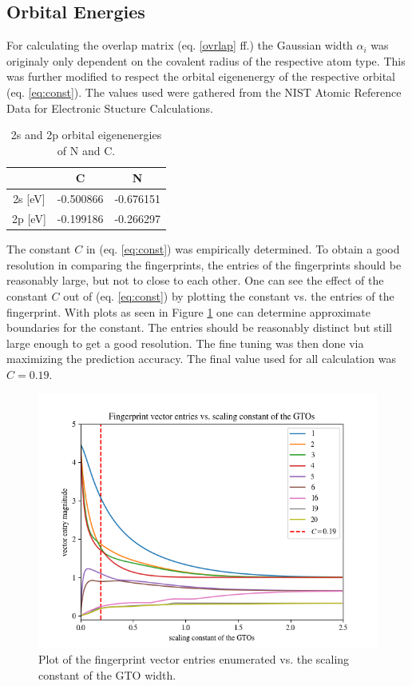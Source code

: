 \subsection{Orbital Energies}
For calculating the overlap matrix (eq. \ref{ovrlap} ff.) the Gaussian width $\alpha_i$ was originaly only dependent on the covalent radius of the respective atom type. This was further modified to respect the orbital eigenenergy of the respective orbital (eq. \ref{eq:const}). The values used were gathered from the NIST Atomic Reference Data for Electronic Stucture Calculations.

\begin{table}[h!]
\center
\label{table:energies}
\begin{tabular}{c|c|c}
            & \textbf{C} & \textbf{N} \\ \hline
2s {[}eV{]} & -0.500866  & -0.676151  \\ \hline
2p {[}eV{]} & -0.199186  & -0.266297 
\end{tabular}
\caption{2s and 2p orbital eigenenergies of N and C.}
\end{table}

The constant $C$ in (eq. \ref{eq:const}) was empirically determined. To obtain a good resolution in comparing the fingerprints, the entries of the fingerprints should be reasonably large, but not to close to each other. One can see the effect of the constant $C$ out of (eq. \ref{eq:const}) by plotting the constant vs. the entries of the fingerprint.
With plots as seen in Figure \ref{fig:const} one can determine approximate boundaries for the constant. The entries should be reasonably distinct but still large enough to get a good resolution. The fine tuning was then done via maximizing the prediction accuracy. The final value used for all calculation was $C=0.19$.


\begin{figure}[h]

\includegraphics[width=\linewidth]{Figures/fpentry.png}
\caption{Plot of the fingerprint vector entries enumerated vs. the scaling constant of the GTO width.}
\label{fig:const} 
\end{figure}

